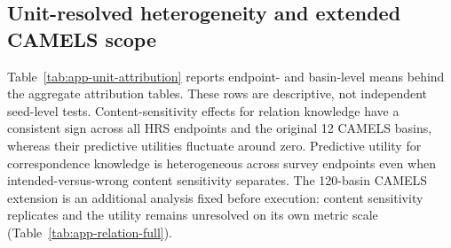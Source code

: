
\subsection{Unit-resolved heterogeneity and extended CAMELS scope}

Table~\ref{tab:app-unit-attribution} reports endpoint- and basin-level means
behind the aggregate attribution tables.  These rows are descriptive, not
independent seed-level tests.  Content-sensitivity effects for relation knowledge have a consistent sign
across all HRS endpoints and the original 12 CAMELS basins, whereas their
predictive utilities fluctuate around zero.  Predictive utility for correspondence knowledge is heterogeneous
across survey endpoints even when intended-versus-wrong content sensitivity separates.
The 120-basin CAMELS extension is an additional analysis fixed before execution:
content sensitivity replicates and the utility remains unresolved on its own metric
scale (Table~\ref{tab:app-relation-full}).

